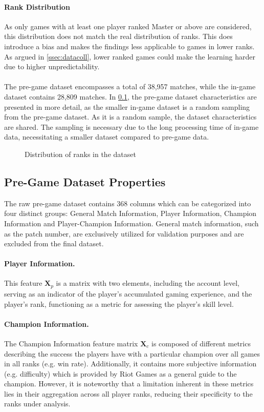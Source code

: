 \documentclass[12pt, a4paper, headinclude, twoside, plainheadsepline, open=right, numbers=noenddot, hidelinks, toc=listof, toc=bibliography]{scrreprt}
\begin{document}
\paragraph{Rank Distribution}
As only games with at least one player ranked Master or above are considered, this distribution does not match the real distribution of ranks.
This does introduce a bias and makes the findings less applicable to games in lower ranks.
As argued in \ref{ssec:datacoll}, lower ranked games could make the learning harder due to higher unpredictability.
\\\\
The pre-game dataset encompasses a total of 38,957 matches, while the in-game dataset contains 28,809 matches.
In \ref{ssec:dataprop}, the pre-game dataset characteristics are presented in more detail, as the smaller in-game dataset is a random sampling from the pre-game dataset. 
As it is a random sample, the dataset characteristics are shared. 
The sampling is necessary due to the long processing time of in-game data, necessitating a smaller dataset compared to pre-game data.

\begin{figure}[htbp]
\centering
\resizebox{\textwidth}{!}
{

}
\caption{Distribution of ranks in the dataset}
\label{fig:tier}
\end{figure}


\subsection{Pre-Game Dataset Properties}
\label{ssec:dataprop}

The raw pre-game dataset contains $368$ columns which can be categorized into four distinct groups: General Match Information, Player Information, Champion Information and Player-Champion Information.
General match information, such as the patch number, are exclusively utilized for validation purposes and are excluded from the final dataset.

\paragraph{Player Information.}
This feature $\mathbf{X}_p$ is a matrix with two elements, including the account level, serving as an indicator of the player's accumulated gaming experience, and the player's rank, functioning as a metric for assessing the player's skill level.

\paragraph{Champion Information.}
The Champion Information feature matrix $\mathbf{X}_c$ is composed of different metrics describing the success the players have with a particular champion over all games in all ranks (e.g. win rate).
Additionally, it contains more subjective information (e.g. difficulty) which is provided by Riot Games as a general guide to the champion.
However, it is noteworthy that a limitation inherent in these metrics lies in their aggregation across all player ranks, reducing their specificity to the ranks under analysis.
\end{document}
